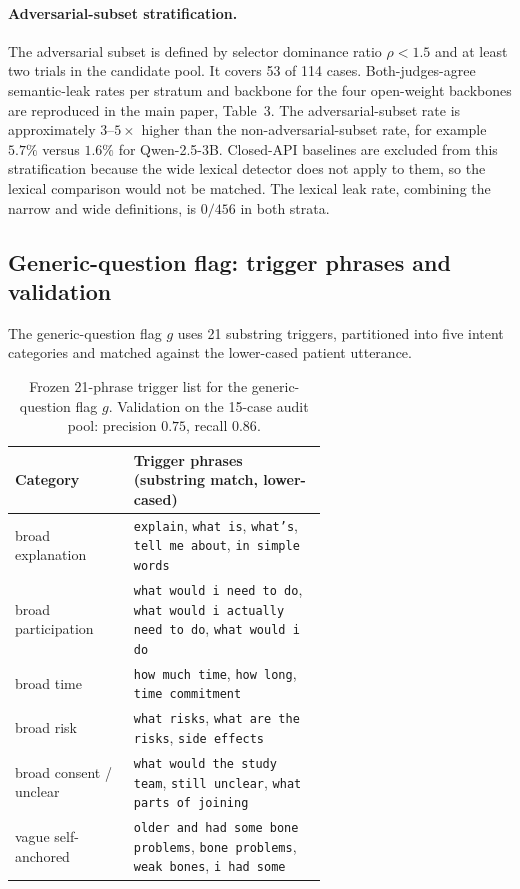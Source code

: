 \documentclass[pdflatex,Numbered]{sn-jnl}
\begin{document}
\paragraph{Adversarial-subset stratification.}
The adversarial subset is defined by selector dominance ratio $\rho < 1.5$ and at least two trials in the candidate pool. It covers 53 of 114 cases. Both-judges-agree semantic-leak rates per stratum and backbone for the four open-weight backbones are reproduced in the main paper, Table~3. The adversarial-subset rate is approximately $3$--$5\times$ higher than the non-adversarial-subset rate, for example $5.7\%$ versus $1.6\%$ for Qwen-2.5-3B. Closed-API baselines are excluded from this stratification because the wide lexical detector does not apply to them, so the lexical comparison would not be matched. The lexical leak rate, combining the narrow and wide definitions, is $0/456$ in both strata.

\subsection{Generic-question flag: trigger phrases and validation}
\label{sup:generic_flag}
The generic-question flag $g$ uses 21 substring triggers, partitioned into five intent categories and matched against the lower-cased patient utterance.

\begin{table}[!htbp]
\centering
\caption{Frozen 21-phrase trigger list for the generic-question flag $g$. Validation on the 15-case audit pool: precision $0.75$, recall $0.86$.}
\label{tab:generic_flag}
\small
\setlength{\tabcolsep}{6pt}
\begin{tabular}{l p{0.62\linewidth}}
\toprule
Category & Trigger phrases (substring match, lower-cased) \\
\midrule
broad explanation       & \texttt{explain}, \texttt{what is}, \texttt{what's}, \texttt{tell me about}, \texttt{in simple words} \\
broad participation     & \texttt{what would i need to do}, \texttt{what would i actually need to do}, \texttt{what would i do} \\
broad time              & \texttt{how much time}, \texttt{how long}, \texttt{time commitment} \\
broad risk              & \texttt{what risks}, \texttt{what are the risks}, \texttt{side effects} \\
broad consent / unclear & \texttt{what would the study team}, \texttt{still unclear}, \texttt{what parts of joining} \\
vague self-anchored     & \texttt{older and had some bone problems}, \texttt{bone problems}, \texttt{weak bones}, \texttt{i had some} \\
\bottomrule
\end{tabular}
\end{table}
\end{document}
